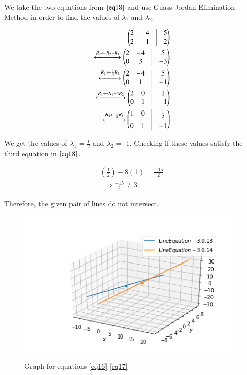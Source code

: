 \documentclass[journal,12pt,twocolumn]{IEEEtran}
\begin{document}
\begin{enumerate}
We take the two equations from $\ref{eq18}$ and use Guass-Jordan Elimination Method in order to find the values of $\lambda_1$ and $\lambda_2$.



\begin{align}
	\myvec{
		2 & -4 & \vrule & 5 \\
		2 & -1 & \vrule & 2 \\
	}
	\\
	\xleftrightarrow[]{R_2 \leftarrow R_2-R_1}
	\myvec{
		2 & -4 & \vrule & 5 \\
		0 & 3 & \vrule & -3 \\
	}
	\\
	\xleftrightarrow[]{R_2\leftarrow \frac{1}{3}R_2} 
	\myvec{
		2 & -4 & \vrule & 5 \\
		0 & 1 & \vrule & -1 \\
	}
	\\
	\xleftrightarrow[]{R_1 \leftarrow R_1+4R_2}
	\myvec{
		2 & 0 & \vrule & 1 \\
		0 & 1 & \vrule & -1 \\
	}
	\\
	\xleftrightarrow[]{R_1 \leftarrow \frac{1}{2}R_1}
	\myvec{
		1 & 0 & \vrule & \frac{1}{2} \\[0.2cm]
		0 & 1 & \vrule & -1 \\
	}
\end{align}

We get the values of $\lambda_1$ = $\frac{1}{2}$ and $\lambda_2$ = -1. Checking if these values satisfy the third equation in $\ref{eq18}$.

\begin{align}
	\left(\frac{1}{2}\right) - 8\left(1\right) = \frac{-15}{2} \\
	\implies \frac{-15}{2} \neq 3
\end{align}

Therefore, the given pair of lines do not intersect.


\begin{figure}
	\centering
	\includegraphics[width=\columnwidth]{./codes/figs/Line_interest_2.png}
	\caption{Graph for equations \ref{eq16} \ref{eq17}}
	\label{fig:line_equation_2}
\end{figure}
\end{enumerate}

    
\end{document}
